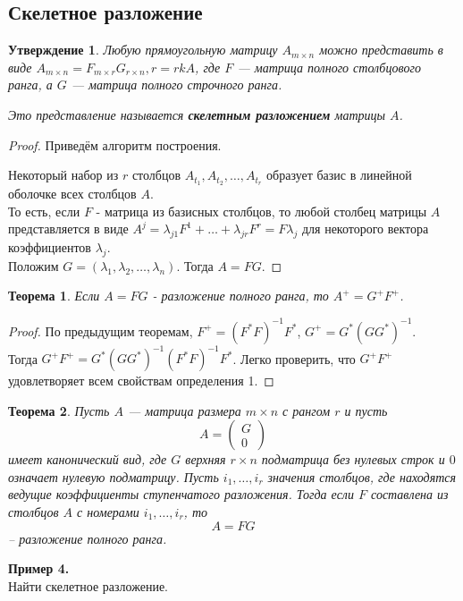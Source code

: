 \documentclass[12pt]{article}
\newtheorem*{theorem}{Теорема}
\newtheorem*{statement}{Утверждение}
\begin{document}
	\subsection{Скелетное разложение}
	\begin{statement}
	Любую прямоугольную матрицу $A_{m \times n}$ можно представить в виде 
	$A_{m \times n}=F_{m \times r}G_{r \times n}, r=rkA$, где $F$ --- матрица полного столбцового ранга, а $G$ --- матрица полного строчного ранга.
	
	Это представление называется \textbf{скелетным разложением} матрицы $A$.
	\end{statement}
	\begin{proof}
	Приведём алгоритм построения.
	
	Некоторый набор из $r$ столбцов $A_{t_1}, A_{t_2},\ldots, A_{t_r}$ образует базис в линейной оболочке всех столбцов $A$.\\
	То есть, если $F$ - матрица из базисных столбцов, то любой столбец матрицы $A$ представляется в виде $A^j=\lambda_{j1}F^1+\ldots+\lambda_{jr}F^r=F\lambda_j$ для некоторого вектора коэффициентов $\lambda_j$.\\
	Положим $G=(\lambda_1, \lambda_2,\ldots, \lambda_n)$. Тогда $A=FG$.
	\end{proof}
	\begin{theorem}
		Если $A=FG$ - разложение полного ранга, то $A^+=G^+F^+$.
	\end{theorem}
	\begin{proof}
		По предыдущим теоремам, $F^+=(F^*F)^{-1}F^*$, $G^+=G^*(GG^*)^{-1}$.\\
	Тогда $G^+F^+=G^*(GG^*)^{-1}(F^*F)^{-1}F^*$. Легко проверить, что $G^+F^+$ удовлетворяет всем свойствам определения 1.
	\end{proof}
	\begin{theorem}
		Пусть $A $ --- матрица размера $m\times n$
	с рангом $r$ и пусть
	$$
	A = \left( \begin{array}{c} G \\ 0\end{array} \right)
	$$
	имеет канонический вид,
	где $G$ верхняя $r\times n$ подматрица без нулевых строк и
	$0$ означает нулевую подматрицу. Пусть $i_1, \dots ,i_r$ значения столбцов, где находятся ведущие коэффициенты ступенчатого разложения. Тогда если $F$ составлена из столбцов $A$ с номерами $i_1,
	\dots , i_r$, то
	$$
	A = FG
	$$
	-- разложение полного ранга.
	\end{theorem}
	\textbf{Пример 4.}\\
	Найти скелетное разложение.\\
\end{document}
